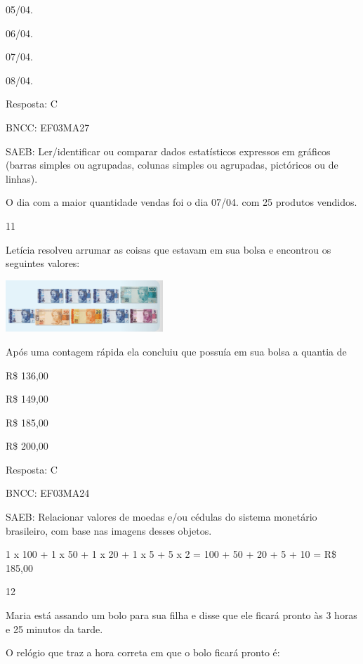 \begin{escolha}
{\begin{escolha}
{\begin{escolha}
\item
  05/04.
\item
  06/04.
\item
  07/04.
\item
  08/04.
\end{escolha}

Resposta: C

BNCC: EF03MA27

SAEB: Ler/identificar ou comparar dados estatísticos
expressos em gráficos (barras simples ou agrupadas, colunas simples ou
agrupadas, pictóricos ou de linhas).

O dia com a maior quantidade vendas foi o dia 07/04. com 25 produtos vendidos.

\num{11}

Letícia resolveu arrumar as coisas que estavam em sua bolsa e encontrou os seguintes valores:

\includegraphics[width=2.33354in,height=0.76673in]{media/image125.png}

Após uma contagem rápida ela concluiu que possuía em sua bolsa a quantia de

\begin{escolha}

\item
  R\$ 136,00
\item
  R\$ 149,00
\item
  R\$ 185,00
\item
  R\$ 200,00
\end{escolha}

Resposta: C

BNCC: EF03MA24

SAEB: Relacionar valores de moedas e/ou cédulas do sistema
monetário brasileiro, com base nas imagens desses objetos.

1 x 100 + 1 x 50 + 1 x 20 + 1 x 5 + 5 x 2 = 100 + 50 + 20 + 5 + 10 = R\$
185,00

\num{12}

Maria está assando um bolo para sua filha e disse que ele ficará pronto
às 3 horas e 25 minutos da tarde.

O relógio que traz a hora correta em que o bolo ficará pronto é:


}
\end{escolha}}
\end{escolha}
